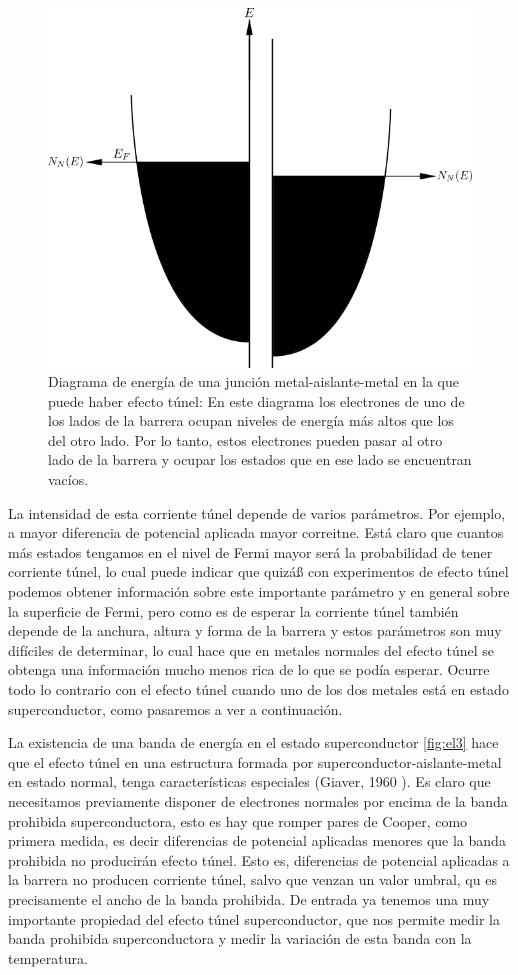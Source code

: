 \begin{figure}[H]
\centering \includegraphics[width=0.8\linewidth]{img/el2.png}
\caption[Diagrama de energía de una junción metal-aislante-metal en la que puede haber efecto túnel]{Diagrama de energía de una junción metal-aislante-metal en la que puede haber efecto túnel: En este diagrama los electrones de uno de los lados de la barrera ocupan niveles de energía más altos que los del otro lado. Por lo tanto, estos electrones pueden pasar al otro lado de la barrera y ocupar los estados que en ese lado se encuentran vacíos.}
\label{fig:el2}
\end{figure}

La intensidad de esta corriente túnel depende de varios parámetros. Por ejemplo, a mayor diferencia de potencial aplicada mayor correitne. Está claro que cuantos más estados tengamos en el nivel de Fermi mayor será la probabilidad de tener corriente túnel, lo cual puede indicar que quizáß con experimentos de efecto túnel podemos obtener información sobre este importante parámetro y en general sobre la superficie de Fermi, pero como es de esperar la corriente túnel también depende de la anchura, altura y forma de la barrera y estos parámetros son muy difíciles de determinar, lo cual hace que en metales normales del efecto túnel se obtenga una información mucho menos rica de lo que se podía esperar. Ocurre todo lo contrario con el efecto túnel cuando uno de los dos metales está en estado superconductor, como pasaremos a ver a continuación.

La existencia de una banda de energía en el estado superconductor \ref{fig:el3} hace que el efecto túnel en una estructura formada por superconductor-aislante-metal en estado normal, tenga características especiales (Giaver, 1960 \cite{giaever}). Es claro que necesitamos previamente disponer de electrones normales por encima de la banda prohibida superconductora, esto es hay que romper pares de Cooper, como primera medida, es decir diferencias de potencial aplicadas menores que la banda prohibida no producirán efecto túnel. Esto es, diferencias de potencial aplicadas a la barrera no producen corriente túnel, salvo que venzan un valor umbral, qu es precisamente el ancho de la banda prohibida. De entrada ya tenemos una muy importante propiedad del efecto túnel superconductor, que nos permite medir la banda prohibida superconductora y medir la variación de esta banda con la temperatura.

